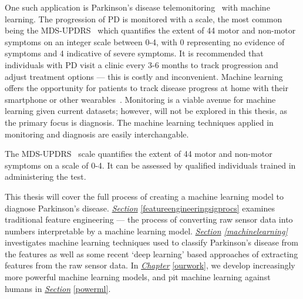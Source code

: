 \documentclass[12pt, twoside]{book}
\renewcommand\emph[1]{\textit{\color{USred}{#1}}}
\begin{document}
One such application is Parkinson's disease telemonitoring~\cite{splittledysphonia2009, sptsanastelemonitor2010} with machine learning. The progression of PD is monitored with a scale, the most common being the MDS-UPDRS~\cite{updrs} which quantifies the extent of 44 motor and non-motor symptoms on an integer scale between 0-4, with 0 representing no evidence of symptoms and 4 indicative of severe symptoms. It is recommended that individuals with PD visit a clinic every 3-6 months to track progression and adjust treatment options --- this is costly and inconvenient. Machine learning offers the opportunity for patients to track disease progress at home with their smartphone or other wearables~\cite{cancela2016monitoring}. Monitoring is a viable avenue for machine learning given current datasets; however, will not be explored in this thesis, as the primary focus is diagnosis. The machine learning techniques applied in monitoring and diagnosis are easily interchangable.

\begin{highlight}[UPDRS]
The MDS-UPDRS~\cite{updrs} scale quantifies the extent of 44 motor and non-motor symptoms on a scale of 0-4. It can be assessed by qualified individuals trained in administering the test.
\end{highlight}




This thesis will cover the full process of creating a machine learning model to diagnose Parkinson's disease. \textit{\hyperref[featureengineeringsigprocs]{Section}} \ref{featureengineeringsigprocs} examines traditional feature engineering --- the process of converting raw sensor data into numbers interpretable by a machine learning model. \textit{\hyperref[machinelearning]{Section} \ref{machinelearning}} investigates machine learning techniques used to classify Parkinson's disease from the features as well as some recent `deep learning' based approaches of extracting features from the raw sensor data. In \textit{\hyperref[ourwork]{Chapter}} \ref{ourwork}, we develop increasingly more powerful machine learning models, and pit machine learning against humans in \textit{\hyperref[powerml]{Section}} \ref{powerml}.
\end{document}
